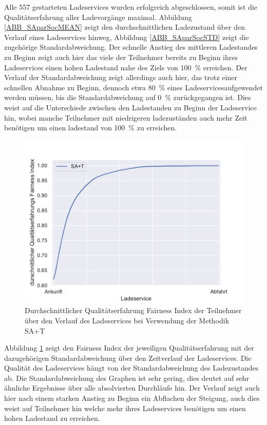 Alle 557 gestarteten Ladeservices wurden erfolgreich abgeschlossen, somit ist die Qualitätserfahrung aller Ladevorgänge maximal. Abbildung \ref{ABB_SAparSocMEAN} zeigt den durchschnittlichen Ladezustand über den Verlauf eines Ladeservices hinweg, Abbildung \ref{ABB_SAparSocSTD} zeigt die zugehörige Standardabweichung. Der schnelle Anstieg des mittleren Ladestandes zu Beginn zeigt auch hier das viele der Teilnehmer bereits zu Beginn ihres Ladeservices einen hohen Ladestand nahe des Ziels von 100~\% erreichen. Der Verlauf der Standardabweichung zeigt allerdings auch hier, das trotz einer schnellen Abnahme zu Beginn, dennoch etwa 80~\% eines Ladeservicesaufgewendet werden müssen, bis die Standardabweichung auf 
0~\% zurückgegangen ist. Dies weist auf die Unterschiede zwischen den Ladestanden zu Beginn der Ladeservice hin, wobei manche Teilnehmer mit niedrigeren ladezuständen auch mehr Zeit benötigen um einen ladestand von 100~\% zu erreichen.
\begin{figure}[htb]
\centering
	\includegraphics[scale=0.45]{img/SA_par/SlottedAloha_participants_VDE_tau_10_qoe.pdf}
	\caption{Durchschnittlicher Qualitätserfahrung Fairness Index der Teilnehmer über den Verlauf des Ladeservices bei Verwendung der Methodik SA+T}
	\label{Abb_SAparFairness}
\end{figure}
Abbildung \ref{Abb_SAparFairness} zeigt den Fairness Index der jeweiligen Qualitätserfahrung mit der dazugehörigen Standardabweichung über den Zeitverlauf der Ladeservices. Die Qualität des Ladeservices hängt von der Standardabweichung des Ladezustandes ab. Die Standardabweichung des Graphen ist sehr gering, dies deutet auf sehr ähnliche Ergebnisse über alle absolvierten Durchläufe hin. Der Verlauf zeigt auch hier nach einem starken Anstieg zu Beginn ein Abflachen der Steigung, auch dies weist auf Teilnehmer hin welche mehr ihres Ladeservices benötigen um einen hohen Ladestand zu erreichen.

